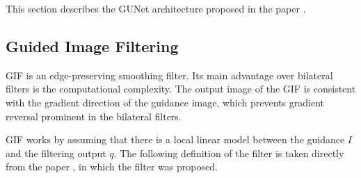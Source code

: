 This section describes the \gls{GUNet} architecture proposed in the paper \cite{gunet}.

\subsection{Guided Image Filtering}
\label{subsec:guided_image_filtering}

\gls{GIF} is an edge-preserving smoothing filter. Its main advantage over bilateral filters is the computational complexity. The output image of the \gls{GIF} is consistent with the gradient direction of the guidance image, which prevents gradient reversal prominent in the bilateral filters.

\gls{GIF} works by assuming that there is a local linear model between the guidance $I$ and the filtering output $q$. The following definition of the filter is taken directly from the paper \cite{gif}, in which the filter was proposed.

